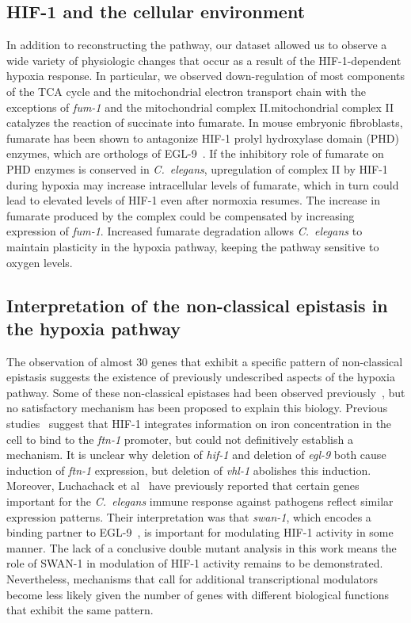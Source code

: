 \documentclass[10pt, onecolumn]{article}
\newcommand{\cel}{\emph{C.~elegans}}
\newcommand{\gene}[1]{\emph{#1}}
\newcommand{\ftna}{\emph{\mbox{ftn-1}}}
\newcommand{\eglp}{EGL-9}
\newcommand{\hifp}{HIF-1}
\begin{document}
\subsection*{\hifp{} and the cellular environment}

In addition to reconstructing the pathway, our dataset allowed us
to observe a wide variety of physiologic changes that occur as a result of the
\hifp{}-dependent hypoxia response. In particular, we observed down-regulation of most
components of the TCA cycle and the mitochondrial electron transport chain with
the exceptions of \gene{fum-1} and the mitochondrial complex II.\@The mitochondrial
complex II catalyzes the reaction of succinate into fumarate.
In mouse embryonic fibroblasts, fumarate has been
shown to antagonize \hifp{} prolyl hydroxylase domain (PHD) enzymes, which are
orthologs of \eglp{}~\cite{Sudarshan2009}.
If the inhibitory role of fumarate on PHD enzymes is conserved in \cel{},
upregulation of complex II by \hifp{} during hypoxia may increase
intracellular levels of fumarate, which in turn could lead to elevated
levels of \hifp{}
even after normoxia resumes. The increase in fumarate produced by the complex
could be compensated by increasing expression of \gene{fum-1}. Increased fumarate
degradation allows \cel{} to maintain plasticity in the hypoxia pathway, keeping
the pathway sensitive to oxygen levels.

\subsection*{Interpretation of the non-classical epistasis in the hypoxia pathway}
The observation of almost 30 genes that exhibit a specific pattern of non-classical
epistasis suggests the existence of previously undescribed aspects of the hypoxia
pathway. Some of these non-classical epistases had been observed
previously~\cite{Ackerman2012,Romney2011,Luhachack2012}, but
no satisfactory mechanism has been proposed to explain this biology.
Previous studies~\cite{Romney2011,Ackerman2012} suggest that \hifp{} integrates
information on iron concentration in the cell to bind to the \ftna{} promoter,
but could not definitively establish a mechanism.
It is unclear why deletion of \gene{hif-1} and deletion of \gene{egl-9} both
cause induction of \ftna{} expression,
but deletion of \gene{vhl-1} abolishes this induction. Moreover, Luchachack et
al~\cite{Luhachack2012} have previously reported that certain genes important
for the \cel{} immune response against pathogens reflect similar expression
patterns. Their interpretation was that \gene{swan-1}, which encodes a binding
partner to \eglp{}~\cite{Shao2010}, is important for modulating \hifp{} activity
in some manner. The lack of a conclusive double mutant analysis in this work
means the role of SWAN-1 in modulation of \hifp{} activity remains to be
demonstrated. Nevertheless, mechanisms that call for additional transcriptional
modulators become less likely given the number of genes with different biological
functions that exhibit the same pattern.
\end{document}
